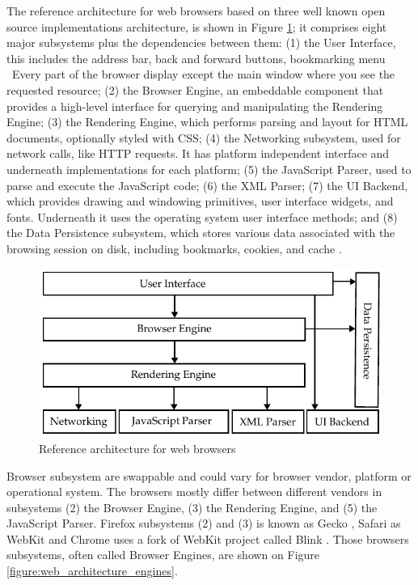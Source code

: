 The reference architecture for web browsers based on three well known open source implementations architecture, is shown in Figure \ref{figure:web_architecture}; it comprises eight major subsystems plus the dependencies between them: (1) the User Interface, this includes the address bar, back and forward buttons, bookmarking menu \etc\ Every part of the browser display except the main window where you see the requested resource; (2) the Browser Engine, an embeddable component that provides a high-level interface for querying and manipulating the Rendering Engine; (3) the Rendering Engine, which performs parsing and layout for HTML documents, optionally styled with CSS; (4) the Networking subsystem, used for network calls, like HTTP requests. It has platform independent interface and underneath implementations for each platform; (5) the JavaScript Parser, used to parse and execute the JavaScript code; (6) the XML Parser; (7) the UI Backend, which provides drawing and windowing primitives, user interface widgets, and fonts. Underneath it uses the operating system user interface methods; and (8) the Data Persistence subsystem, which stores various data associated with the browsing session on disk, including bookmarks, cookies, and cache \cite{Grosskurth2005}.

\begin{figure}[!htb]
  \centering
  \includegraphics{chapters/basic_concepts/web_architecture.pdf}
  \caption{Reference architecture for web browsers}
  \label{figure:web_architecture}
\end{figure}

Browser subsystem are swappable and could vary for browser vendor, platform or operational system. The browsers mostly differ between different vendors in subsystems (2) the Browser Engine, (3) the Rendering Engine, and (5) the JavaScript Parser. Firefox subsystems (2) and (3) is known as Gecko \cite{Firefox2013} \cite{Gecko2013}, Safari as WebKit \cite{Safari2013} \cite{WebKit2013} and Chrome uses a fork of WebKit project called Blink \cite{Chrome2010} \cite{Blink2013}. Those browsers subsystems, often called Browser Engines, are shown on Figure \ref{figure:web_architecture_engines}.

